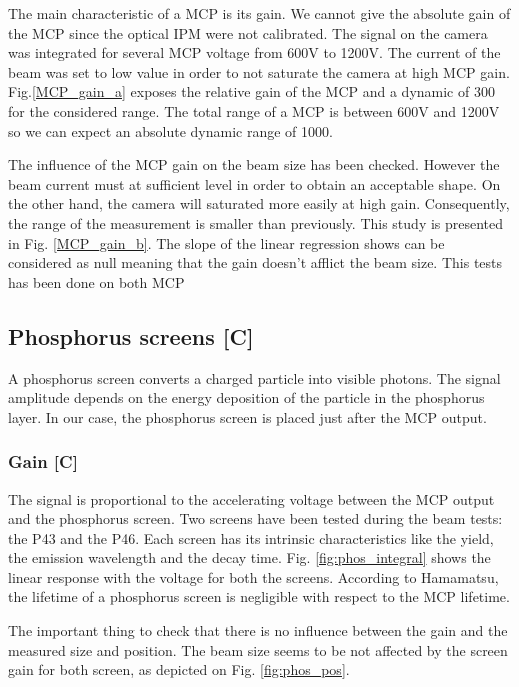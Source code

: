 \begin{refsection}
  The main characteristic of a MCP is its gain. We cannot give the absolute gain of the MCP since the optical IPM were not calibrated. The signal on the camera was integrated for several MCP voltage from 600V to 1200V. The current of the beam was set to low value in order to not saturate the camera at high MCP gain. Fig.\ref{MCP_gain_a} exposes the relative gain of the MCP and a dynamic of 300 for the considered range. The total range of a MCP is between 600V and 1200V so we can expect an absolute dynamic range of 1000.

  The influence of the MCP gain on the beam size has been checked. However the beam current must at sufficient level in order to obtain an acceptable shape. On the other hand, the camera will  saturated more easily at high gain. Consequently, the range of the measurement is smaller than previously. This study is presented in Fig. \ref{MCP_gain_b}. The slope of the linear regression shows can be considered as null meaning that the gain doesn’t afflict the beam size. This tests has been done on both MCP

  

  \subsection{Phosphorus screens [C]}
  A phosphorus screen converts a charged particle into visible photons.
  The signal amplitude depends on the energy deposition of the particle in the phosphorus layer. In our case, the phosphorus screen is placed just after the MCP output.

  \subsubsection{Gain [C]}
  The signal is proportional to the accelerating voltage between the MCP output and the phosphorus screen. Two screens have been tested during the beam tests: the P43 and the P46. Each screen has its intrinsic characteristics like the yield, the emission wavelength and the decay time. Fig. \ref{fig:phos_integral} shows the linear response with the voltage for both the screens. According to Hamamatsu, the lifetime of a phosphorus screen is negligible with respect to the MCP lifetime.

  

  The important thing to check that there is no influence between the gain and the measured size and position. The beam size seems to be not affected by the screen gain for both screen, as depicted on Fig. \ref{fig:phos_pos}.


\end{refsection}

